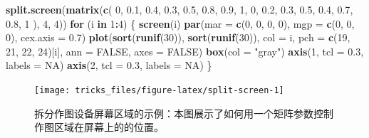 \documentclass[
  b5paper,
  UTF8,twoside]{book}
\newenvironment{Shaded}{\begin{snugshade}}{\end{snugshade}}
\newcommand{\AttributeTok}[1]{\textcolor[rgb]{0.13,0.29,0.53}{#1}}
\newcommand{\ConstantTok}[1]{\textcolor[rgb]{0.56,0.35,0.01}{#1}}
\newcommand{\ControlFlowTok}[1]{\textcolor[rgb]{0.13,0.29,0.53}{\textbf{#1}}}
\newcommand{\DecValTok}[1]{\textcolor[rgb]{0.00,0.00,0.81}{#1}}
\newcommand{\FloatTok}[1]{\textcolor[rgb]{0.00,0.00,0.81}{#1}}
\newcommand{\FunctionTok}[1]{\textcolor[rgb]{0.13,0.29,0.53}{\textbf{#1}}}
\newcommand{\NormalTok}[1]{#1}
\newcommand{\SpecialCharTok}[1]{\textcolor[rgb]{0.81,0.36,0.00}{\textbf{#1}}}
\newcommand{\StringTok}[1]{\textcolor[rgb]{0.31,0.60,0.02}{#1}}
\begin{document}
\begin{Shaded}
\begin{Highlighting}[]
\FunctionTok{split.screen}\NormalTok{(}\FunctionTok{matrix}\NormalTok{(}\FunctionTok{c}\NormalTok{(}
  \DecValTok{0}\NormalTok{, }\FloatTok{0.1}\NormalTok{, }\FloatTok{0.4}\NormalTok{, }\FloatTok{0.3}\NormalTok{, }\FloatTok{0.5}\NormalTok{, }\FloatTok{0.8}\NormalTok{,}
  \FloatTok{0.9}\NormalTok{, }\DecValTok{1}\NormalTok{, }\DecValTok{0}\NormalTok{, }\FloatTok{0.2}\NormalTok{, }\FloatTok{0.3}\NormalTok{, }\FloatTok{0.5}\NormalTok{, }\FloatTok{0.4}\NormalTok{, }\FloatTok{0.7}\NormalTok{, }\FloatTok{0.8}\NormalTok{, }\DecValTok{1}
\NormalTok{), }\DecValTok{4}\NormalTok{, }\DecValTok{4}\NormalTok{))}
\ControlFlowTok{for}\NormalTok{ (i }\ControlFlowTok{in} \DecValTok{1}\SpecialCharTok{:}\DecValTok{4}\NormalTok{) \{}
  \FunctionTok{screen}\NormalTok{(i)}
  \FunctionTok{par}\NormalTok{(}\AttributeTok{mar =} \FunctionTok{c}\NormalTok{(}\DecValTok{0}\NormalTok{, }\DecValTok{0}\NormalTok{, }\DecValTok{0}\NormalTok{, }\DecValTok{0}\NormalTok{), }\AttributeTok{mgp =} \FunctionTok{c}\NormalTok{(}\DecValTok{0}\NormalTok{, }\DecValTok{0}\NormalTok{, }\DecValTok{0}\NormalTok{), }\AttributeTok{cex.axis =} \FloatTok{0.7}\NormalTok{)}
  \FunctionTok{plot}\NormalTok{(}\FunctionTok{sort}\NormalTok{(}\FunctionTok{runif}\NormalTok{(}\DecValTok{30}\NormalTok{)), }\FunctionTok{sort}\NormalTok{(}\FunctionTok{runif}\NormalTok{(}\DecValTok{30}\NormalTok{)), }\AttributeTok{col =}\NormalTok{ i, }
       \AttributeTok{pch =} \FunctionTok{c}\NormalTok{(}\DecValTok{19}\NormalTok{, }\DecValTok{21}\NormalTok{, }\DecValTok{22}\NormalTok{, }\DecValTok{24}\NormalTok{)[i], }\AttributeTok{ann =} \ConstantTok{FALSE}\NormalTok{, }\AttributeTok{axes =} \ConstantTok{FALSE}\NormalTok{)}
  \FunctionTok{box}\NormalTok{(}\AttributeTok{col =} \StringTok{"gray"}\NormalTok{)}
  \FunctionTok{axis}\NormalTok{(}\DecValTok{1}\NormalTok{, }\AttributeTok{tcl =} \FloatTok{0.3}\NormalTok{, }\AttributeTok{labels =} \ConstantTok{NA}\NormalTok{)}
  \FunctionTok{axis}\NormalTok{(}\DecValTok{2}\NormalTok{, }\AttributeTok{tcl =} \FloatTok{0.3}\NormalTok{, }\AttributeTok{labels =} \ConstantTok{NA}\NormalTok{)}
\NormalTok{\}}
\end{Highlighting}
\end{Shaded}

\begin{figure}

{\centering \texttt{[image: tricks\_files/figure-latex/split-screen-1]} 

}

\caption[拆分作图设备屏幕区域的示例]{拆分作图设备屏幕区域的示例：本图展示了如何用一个矩阵参数控制作图区域在屏幕上的的位置。}\label{fig:split-screen}
\end{figure}
\end{document}
